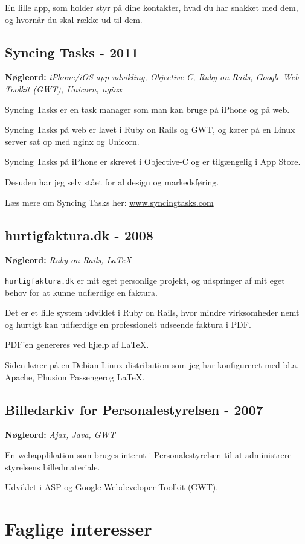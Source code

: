 \documentclass[a4paper]{article}
\newcommand{\keywords}[1]{\small\textbf{Nøgleord:} \emph{#1}\normalsize}
\begin{document}
En lille app, som holder styr på dine kontakter, hvad du har snakket med dem, og hvornår du skal række ud til dem.

\subsection*{Syncing Tasks - 2011}
\keywords{iPhone/iOS app udvikling, Objective-C, Ruby on Rails, Google Web Toolkit (GWT), Unicorn, nginx}

Syncing Tasks er en task manager som man kan bruge på iPhone og på web. 

Syncing Tasks på web er lavet i Ruby on Rails og GWT, og kører på en Linux server sat op med nginx og Unicorn.

Syncing Tasks på iPhone er skrevet i Objective-C og er tilgængelig i App Store.

Desuden har jeg selv stået for al design og markedsføring.

Læs mere om Syncing Tasks her: \href{http://www.syncingtasks.com}{www.syncingtasks.com}

\subsection*{hurtigfaktura.dk - 2008}
\keywords{Ruby on Rails, \LaTeX}

\texttt{hurtigfaktura.dk} er mit eget personlige projekt, og udspringer af mit eget behov for at kunne udfærdige en faktura.

Det er et lille system udviklet i Ruby on Rails, hvor mindre virksomheder nemt og hurtigt kan udfærdige en professionelt udseende faktura i PDF.

PDF'en genereres ved hjælp af \LaTeX.

Siden kører på en Debian Linux distribution som jeg har konfigureret med bl.a. Apache, Phusion Passenger\texttrademark og \LaTeX.


\subsection*{Billedarkiv for Personalestyrelsen - 2007} 
\keywords{Ajax, Java, GWT}

En webapplikation som bruges internt i Personalestyrelsen til at administrere styrelsens billedmateriale.

Udviklet i ASP og Google Webdeveloper Toolkit (GWT).

\section*{Faglige interesser}
\end{document}
